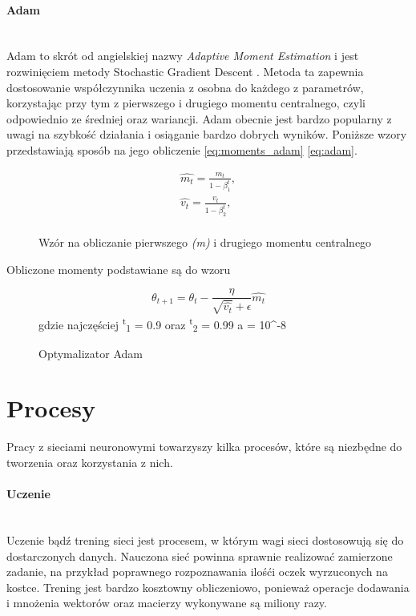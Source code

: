 \paragraph{Adam} \mbox{}\\
Adam to skrót od angielskiej nazwy \textit{Adaptive Moment Estimation} i jest rozwinięciem
metody Stochastic Gradient Descent \cite{AdamOptimizer, OptimizersOverview}.
Metoda ta zapewnia dostosowanie współczynnika uczenia z osobna do każdego z parametrów,
korzystając przy tym z pierwszego i drugiego momentu centralnego, czyli odpowiednio ze
średniej oraz wariancji. Adam obecnie jest bardzo popularny z uwagi na szybkość działania
i osiąganie bardzo dobrych wyników. Poniższe wzory przedstawiają sposób na jego obliczenie \ref{eq:moments_adam} \ref{eq:adam}.
\begin{figure}[h!]
\renewcommand{\figurename}{Wzór}%
\begin{equation} \label{eq:moments_adam}
\begin{align*}
\hat{m_t} = \frac{m_t} {1 - \beta^t_1}, \\
\hat{v_t} = \frac{v_t} {1 - \beta^t_2}, \\
\end{align*}
\end{equation}
\caption{Wzór na obliczanie pierwszego \textit{(m)} i drugiego  momentu centralnego}
\end{figure}
Obliczone momenty podstawiane są do wzoru
\begin{figure}[h!]
\renewcommand{\figurename}{Wzór}%
\begin{equation} \label{eq:adam}
\theta_{t+1} = \theta_t - \frac {\eta} {\sqrt{\hat{v_t}} + \epsilon} \hat{m_t}
\end{equation}
\centering
gdzie najczęściej \textbeta \textsuperscript{t}\textsubscript{1} = 0.9 oraz
\textbeta \textsuperscript{t}\textsubscript{2} = 0.99 a \straightepsilon = 10^{-8}\\
\caption{Optymalizator Adam}
\end{figure}

\section{Procesy}

Pracy z sieciami neuronowymi towarzyszy kilka procesów, które są niezbędne do tworzenia
oraz korzystania z nich.

\paragraph{Uczenie} \mbox{}\\
Uczenie bądź trening sieci jest procesem, w którym wagi sieci dostosowują się do dostarczonych danych.
Nauczona sieć powinna sprawnie realizować zamierzone zadanie, na przykład poprawnego
rozpoznawania ilośći oczek wyrzuconych na kostce. Trening jest bardzo kosztowny obliczeniowo,
ponieważ operacje dodawania i mnożenia wektorów oraz macierzy wykonywane są miliony razy.

